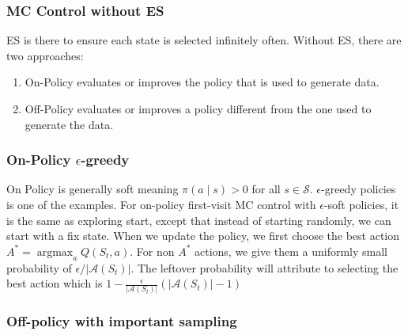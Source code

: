 \documentclass[twocolumn, 10pt]{article}
\DeclareMathOperator*{\argmax}{argmax}
\newcommand{\actionset}{ \mathcal{A}}
\newcommand{\stateset}{\mathcal{S}}
\begin{document}
\subsubsection*{MC Control without ES}
ES is there to ensure each state is selected infinitely often. Without ES, there are two approaches:
\begin{enumerate}
    \item On-Policy evaluates or improves the policy that is used to generate data.
    \item Off-Policy evaluates or improves a policy different from the one used to generate the data.
\end{enumerate}

\subsubsection*{On-Policy $\epsilon$-greedy}
On Policy is generally soft meaning  $\pi(a \mid s) > 0$ for all $s \in \stateset$. $\epsilon$-greedy policies is one of the examples. For on-policy first-visit MC control with $\epsilon$-soft policies, it is the same as exploring start, except that instead of starting randomly, we can start with a fix state. When we update the policy, we first choose the best action $A^* = \argmax_a Q(S_t, a)$. For non $A^*$ actions, we give them a uniformly small probability of $\epsilon / |\actionset(S_t)|$. The leftover probability will attribute to selecting the best action which is $1 -  \frac{\epsilon}{|\actionset(S_t)|} (|\actionset(S_t)| - 1) $

\subsubsection*{Off-policy with important sampling}
\end{document}
